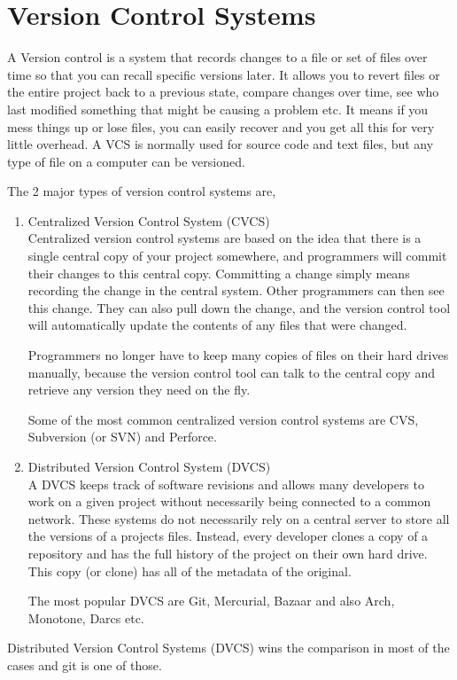 \section{Version Control Systems}

A Version control is a system that records changes to a file or set of
files over time so that you can recall specific versions later. It
allows you to revert files or the entire project back to a previous
state, compare changes over time, see who last modified something that
might be causing a problem etc. It means if you mess things up or lose
files, you can easily recover and you get all this for very little
overhead. A VCS is normally used for source code and
text files, but any type of file on a computer can be versioned.

The 2 major types of version control systems are,

\begin{enumerate}

\item{Centralized Version Control System (CVCS)}  \hfill \\

  Centralized version control systems are based on the idea that there is a
  single central copy of your project somewhere, and programmers will commit
  their changes to this central copy. Committing a change simply means recording
  the change in the central system. Other programmers can then see this change.
  They can also pull down the change, and the version control tool will
  automatically update the contents of any files that were changed.

  Programmers no longer have to keep many copies of files on their hard drives
  manually, because the version control tool can talk to the central copy and
  retrieve any version they need on the fly.

  Some of the most common centralized version control systems are CVS,
  Subversion (or SVN) and Perforce.

\item{Distributed Version Control System (DVCS)}  \hfill \\
  A DVCS keeps track of software revisions and allows many developers to work on
  a given project without necessarily being connected to a common network. These
  systems do not necessarily rely on a central server to store all the versions
  of a projects files. Instead, every developer clones a copy of a repository
  and has the full history of the project on their own hard drive. This copy (or
  clone) has all of the metadata of the original.

  The most popular DVCS are Git, Mercurial, Bazaar and also Arch, Monotone,
  Darcs etc.
\end{enumerate}

Distributed Version Control Systems (DVCS) wins the comparison in most of the
cases and git is one of those.
